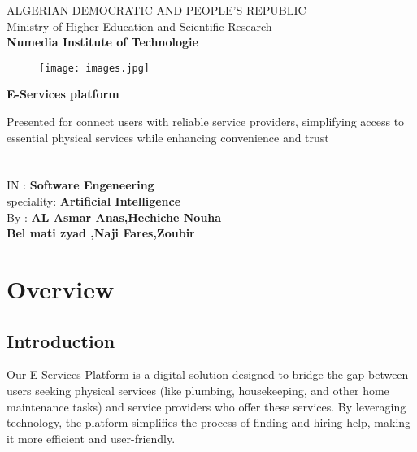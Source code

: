 \documentclass[12pt,a4paper]{report}
\begin{document}
\thispagestyle{empty}

\begin{center}
ALGERIAN DEMOCRATIC AND PEOPLE'S REPUBLIC\\ Ministry of Higher Education and Scientific Research\\
\textbf{Numedia Institute of Technologie}\\
\end{center}
\begin{figure}[H]
  \centering
  \texttt{[image: images.jpg]}
\end{figure}
\begin{center}
\begin{LARGE}
\textbf{E-Services platform}\\
\end{LARGE}
     
      
\begin{large}Presented for connect users with reliable service providers, simplifying access to essential physical services while enhancing convenience and trust\\
\textbf{                      }\\
\textbf{                      }\\
IN : \textbf{Software Engeneering}\\
speciality: \textbf{Artificial Intelligence}\\
By : \textbf{AL Asmar Anas,Hechiche Nouha }\\
\textbf{Bel mati zyad ,Naji Fares,Zoubir}\\


\end{large}
\end{center}
\vfill

\setcounter{page}{0}
\newpage
{}

\newpage
\tableofcontents
\newpage

\chapter{Overview}
\section{Introduction}
Our E-Services Platform is a digital solution designed to bridge the gap between users seeking physical services (like plumbing, housekeeping, and other home maintenance tasks) and service providers who offer these services. By leveraging technology, the platform simplifies the process of finding and hiring help, making it more efficient and user-friendly.
\end{document}
